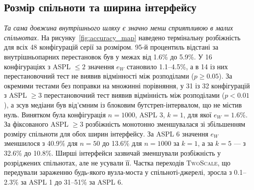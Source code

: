 \documentclass[a4paper,fleqn]{cas-sc}
\newcommand{\TS}{\textup{\textsc{TwoScale}}}
\newcommand{\eW}{e_{W}}
\begin{document}
\subsection{Розмір спільноти та ширина інтерфейсу}
\label{sec:res_size}

\emph{Та сама довжина внутрішнього шляху є значно менш сприятливою в малих спільнотах.} На рисунку~\ref{fig:accuracy_map} наведено термінальну розбіжність для всіх 48 конфігурацій серії за розміром. 95-й процентиль відстані за внутрішньопарних перестановок був у межах від 1.6\% до 5.9\%. У 16 конфігураціях з ASPL $\le2$ значення $\eW$ становило 1.1--4.5\%, а в 14 із них перестановочний тест не виявив відмінності між розподілами ($p\ge0.05$). За окремими тестами без поправки на множинні порівняння, у 31 із 32 конфігурацій з ASPL $\ge3$ перестановочний тест виявив відмінність між розподілами ($p<0.01$), а зсув медіани був від'ємним із блоковим бутстреп-інтервалом, що не містив нуль. Винятком була конфігурація $n=1000$, ASPL 3, $k=1$, для якої $\eW=1.6\%$. За фіксованого ASPL $\ge3$ розбіжність монотонно зменшувалася зі збільшенням розміру спільноти для обох ширин інтерфейсу. За ASPL 6 значення $\eW$ зменшилося з 40.9\% для $n=50$ до 13.6\% для $n=1000$ за $k=1$, а за $k=5$ --- з 32.6\% до 10.8\%. Ширші інтерфейси зазвичай зменшували розбіжність у розріджених спільнотах, але не усували її. Частка переходів \TS{}, що передували зараженню будь-якого вузла-моста у спільноті-джерелі, зросла з 0.1--2.3\% за ASPL 1 до 31--51\% за ASPL 6.
\end{document}
